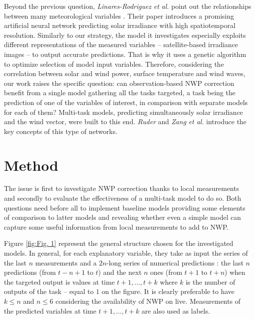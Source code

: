 \documentclass{article}
\newcommand{\saut}{\vspace{10px}}
\begin{document}
\saut

Beyond the previous question, \emph{Linares-Rodriguez et al.} point out the relationships between
many meteorological variables \cite{linares-rodriguez_artificial_2013}. Their paper introduces a promising artificial
neural network predicting solar irradiance with high spatiotemporal resolution. Similarly to our strategy,
the model it investigates especially exploits different representations of the measured variables
-- satellite-based irradiance images -- to output accurate predictions.
That is why it uses a genetic algorithm to optimize selection of model input variables.
Therefore, considering the correlation between solar and wind power,
surface temperature and wind waves, our work raises the specific question: can
observation-based NWP correction benefit from a single model gathering all the tasks targeted,
a task being the prediction of one of the variables of interest, in comparison with
separate models for each of them? Multi-task models, predicting simultaneously solar irradiance and the wind vector,
were built to this end. \emph{Ruder} \cite{ruder_overview_2017} and \emph{Zang et al.} \cite{zhang_overview_2018}
introduce the key concepts of this type of networks.

\section{Method}

The issue is first to investigate NWP correction thanks to local measurements and secondly to evaluate
the effectiveness of a multi-task model to do so. Both questions need before all to implement baseline models
providing some elements of comparison to latter models and revealing whether even a simple model can
capture some useful information from local measurements to add to NWP.

\saut

Figure \ref{fig:Fig. 1} represent the general structure chosen for the investigated models. In general, for each
explanatory variable, they take
as input the series of the last $n$ measurements and a $2n$-long series of numerical predictions : the last $n$
predictions (from $t - n + 1$ to $t$) and the next $n$ ones (from $t + 1$ to $t + n$) when the targeted output is
values at time $t + 1, \dots, t + k$ where $k$ is the number of outputs of the task -- equal to $1$ on the figure.
It is clearly preferable to have $k \leq n$ and $n \leq 6$ considering the availability of NWP on live.
Measurements of the predicted variables at time $t + 1, \dots, t + k$ are also used as labels.
\end{document}

